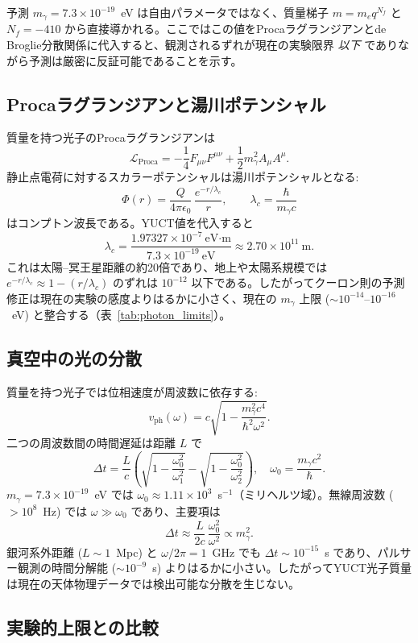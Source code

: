 \documentclass[11pt,a4paper]{article}
\begin{document}
	予測 $m_\gamma = 7.3\times10^{-19}$~eV は自由パラメータではなく、質量梯子 $m = m_e q^{N_f}$ と $N_f = -410$ から直接導かれる。ここではこの値をProcaラグランジアンとde Broglie分散関係に代入すると、観測されるずれが現在の実験限界 \emph{以下} でありながら予測は厳密に反証可能であることを示す。
	
	\subsection{Procaラグランジアンと湯川ポテンシャル}
	
	質量を持つ光子のProcaラグランジアンは
	\[
	\mathcal{L}_{\text{Proca}} = -\frac14 F_{\mu\nu}F^{\mu\nu} + \frac12 m_\gamma^2 A_\mu A^\mu .
	\]
	静止点電荷に対するスカラーポテンシャルは湯川ポテンシャルとなる:
	\[
	\Phi(r) = \frac{Q}{4\pi\epsilon_0}\,\frac{e^{-r/\lambda_c}}{r},
	\qquad
	\lambda_c = \frac{\hbar}{m_\gamma c}
	\]
	はコンプトン波長である。YUCT値を代入すると
	\[
	\lambda_c = \frac{1.97327\times10^{-7}~\text{eV·m}}{7.3\times10^{-19}~\text{eV}}
	\approx 2.70\times10^{11}~\text{m}.
	\]
	これは太陽–冥王星距離の約20倍であり、地上や太陽系規模では $e^{-r/\lambda_c}\approx 1 - (r/\lambda_c)$ のずれは $10^{-12}$ 以下である。したがってクーロン則の予測修正は現在の実験の感度よりはるかに小さく、現在の $m_\gamma$ 上限 ($\sim 10^{-14}$–$10^{-16}$~eV) と整合する（表~\ref{tab:photon_limits}）。
	
	\subsection{真空中の光の分散}
	
	質量を持つ光子では位相速度が周波数に依存する:
	\[
	v_{\text{ph}}(\omega) = c\sqrt{1 - \frac{m_\gamma^2 c^4}{\hbar^2\omega^2}} .
	\]
	二つの周波数間の時間遅延は距離 $L$ で
	\[
	\Delta t = \frac{L}{c}\left( \sqrt{1-\frac{\omega_0^2}{\omega_1^2}} - \sqrt{1-\frac{\omega_0^2}{\omega_2^2}} \right),
	\quad \omega_0 = \frac{m_\gamma c^2}{\hbar}.
	\]
	$m_\gamma = 7.3\times10^{-19}$~eV では $\omega_0 \approx 1.11\times10^{3}$~s$^{-1}$（ミリヘルツ域）。無線周波数 ($>10^8$~Hz) では $\omega \gg \omega_0$ であり、主要項は
	\[
	\Delta t \approx \frac{L}{2c}\,\frac{\omega_0^2}{\omega^2} \propto m_\gamma^2.
	\]
	銀河系外距離 ($L\sim 1$~Mpc) と $\omega/2\pi = 1$~GHz でも $\Delta t \sim 10^{-15}$~s であり、パルサー観測の時間分解能 ($\sim 10^{-9}$~s) よりはるかに小さい。したがってYUCT光子質量は現在の天体物理データでは検出可能な分散を生じない。
	
	\subsection{実験的上限との比較}
	
\end{document}
